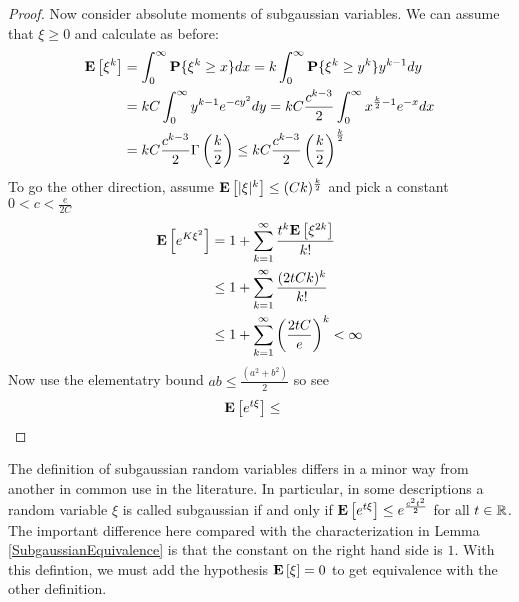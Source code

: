 \begin{proof}
Now consider absolute moments of subgaussian variables.  We can assume
that $\xi \geq 0$ and calculate as before:
\begin{align*}
\textbf{E}\left[\xi^k\right] 
&= \int_0^\infty \textbf{P}\{\xi^k \geq x\} dx 
= k\int_0^\infty \textbf{P}\{\xi^k \geq y^k\} y^{k-1} dy \\
&= k C \int_0^\infty y^{k-1} e^{-cy^2} dy 
= k C \frac{c^{k-3}}{2} \int_0^\infty x^{\frac{k}{2}-1} e^{-x} dx \\
&= k C \frac{c^{k-3}}{2} \Gamma\left(\frac{k}{2}\right) 
\leq k C \frac{c^{k-3}}{2} \left(\frac{k}{2}\right)^\frac{k}{2} \\
\end{align*}
To go the other direction, assume $\textbf{E}\left[|\xi|^k\right] \leq
(Ck)^\frac{k}{2}$ and pick a constant $0 < c < \frac{e}{2C}$ 
\begin{align*}
\textbf{E}\left[e^{K\xi^2}\right] &= 1 + \sum_{k=1}^\infty
\frac{t^k\textbf{E}\left[\xi^{2k}\right]}{k!}\\
&\leq 1 + \sum_{k=1}^\infty
\frac{(2tCk)^k}{k!}\\
&\leq 1 + \sum_{k=1}^\infty
\left(\frac{2tC}{e}\right)^k < \infty \\
\end{align*}
Now use the elementatry bound $ab \leq \frac{(a^2 + b^2)}{2}$ so see
\begin{align*}
\textbf{E}\left[e^{t\xi}\right] &\leq 
\end{align*}
\end{proof}

The definition of subgaussian random variables differs in a minor way
from another in common use in the literature.  In particular, in some descriptions a random
variable $\xi$ is called subgaussian if and only if
$\textbf{E}\left[e^{t\xi}\right] \leq e^{\frac{c^2 t^2}{2}}$ for all $t \in \mathbb{R}$.  The important
difference here compared with the characterization in Lemma
\ref{SubgaussianEquivalence} is that the constant on the right hand side is $1$.
With this defintion, we must add the hypothesis $\textbf{E}\left[\xi\right]=0$
to get equivalence with the other definition.

